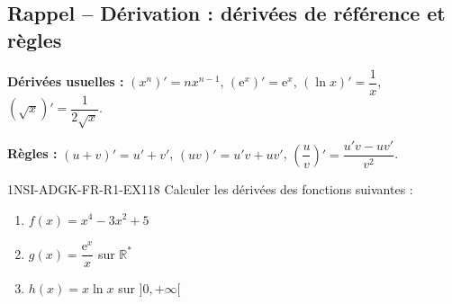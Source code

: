 

\subsection*{Rappel -- Dérivation : dérivées de référence et règles}

\textbf{Dérivées usuelles :} $(x^n)' = n x^{n-1}$, $(\mathrm{e}^x)' = \mathrm{e}^x$, $(\ln x)' = \dfrac{1}{x}$, $(\sqrt{x})' = \dfrac{1}{2\sqrt{x}}$.

\textbf{Règles :} $(u+v)' = u' + v'$, $(uv)' = u'v + uv'$, $\left(\dfrac{u}{v}\right)' = \dfrac{u'v - uv'}{v^2}$.

\begin{exercice}{1NSI-ADGK-FR-R1-EX1}{1}{8}
Calculer les dérivées des fonctions suivantes :
\begin{enumerate}
  \item $f(x) = x^4 - 3x^2 + 5$
  \item $g(x) = \dfrac{\mathrm{e}^x}{x}$ sur $\mathbb{R}^*$
  \item $h(x) = x \ln x$ sur $]0, +\infty[$
\end{enumerate}
\end{exercice}

